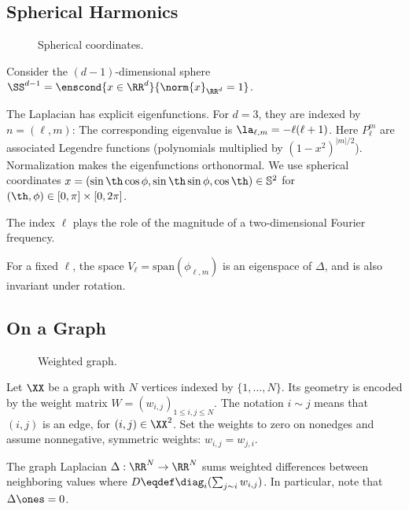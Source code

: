                                                 
\subsection{Spherical Harmonics}
\label{sec-spherical-harm}

\begin{figure}[tbp]
\centering
{}
\caption{Spherical coordinates.}
\label{fig-review-fourier-spherical-coordinates}
\end{figure}
Consider the $(d-1)$-dimensional sphere $\SS^{d-1} = \enscond{x \in \RR^d}{\norm{x}_{\RR^d}=1}$.
  
The Laplacian has explicit eigenfunctions. For $d=3$, they are indexed by $n=(\ell,m)$:
The corresponding eigenvalue is $\la_{\ell,m} = -\ell(\ell+1)$. Here $P_{\ell}^m$ are associated Legendre functions (polynomials multiplied by $(1-x^2)^{|m|/2}$). Normalization makes the eigenfunctions orthonormal. We use spherical coordinates $x=(\sin\th\cos\phi,\sin\th\sin\phi,\cos\th)\in\mathbb S^2$ for $(\th,\phi) \in [0,\pi] \times [0,2\pi]$.
 
The index $\ell$ plays the role of the magnitude of a two-dimensional Fourier frequency.
 
For a fixed $\ell$, the space $V_\ell = \text{span}( \phi_{\ell,m} )$ is an eigenspace of $\Delta$, and is also invariant under rotation. 
	

                                                
\subsection{On a Graph}

\begin{figure}[tbp]
\centering
{}
\caption{Weighted graph.}
\label{fig-review-fourier-weighted-graph}
\end{figure}
Let $\XX$ be a graph with $N$ vertices indexed by $\{1,\ldots,N\}$. Its geometry is encoded by the weight matrix $W=(w_{i,j})_{1\leq i,j\leq N}$. The notation $i \sim j$ means that $(i,j)$ is an edge, for $(i,j) \in \XX^2$. Set the weights to zero on nonedges and assume nonnegative, symmetric weights: $w_{i,j}=w_{j,i}$.

The graph Laplacian $\Delta:\RR^N\to\RR^N$ sums weighted differences between neighboring values
where $D \eqdef \diag_i(\sum_{j \sim i} w_{i,j})$. In particular, note that $\Delta\ones=0$.


